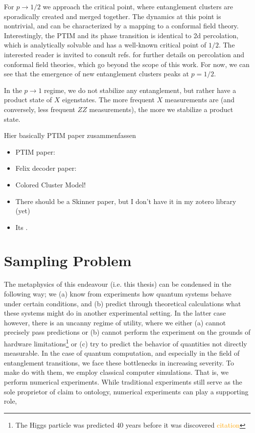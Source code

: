 For $p \to 1 /2$ we approach the critical point,
where entanglement clusters are sporadically created and merged together. The
dynamics at this point is nontrivial, and can be characterized by a mapping to
a conformal field theory. Interestingly, the PTIM and its phase transition is
identical to 2d percolation, which is analytically solvable and has a
well-known critical point of $1 /2$. The interested reader is invited to
consult refs.
\cite{aharonyIntroductionPercolationTheory2017,difrancescoConformalFieldTheory1997}
for further details on percolation and conformal field theories, which go
beyond the scope of this work. For now, we can see that the emergence of new
entanglement clusters peaks at $p = 1 /2$.

In the $p\to 1$ regime, we do not stabilize any entanglement, but rather
have a product state of $X$ eigenstates. The more frequent $X$ measurements are
(and conversely, less frequent $ZZ$ measurements), the more we stabilize a
product state.


Hier basically PTIM paper zusammenfassen
\begin{itemize}
  \item PTIM paper: 
    \cite{langEntanglementTransitionProjective2020}
  \item Felix decoder paper: 
    \cite{roserDecodingProjectiveTransverse2023}
  \item Colored Cluster Model!
  \item There should be a Skinner paper, but I don't have it in my zotero
    library (yet)
  \item Its \cite{nahumEntanglementDynamicsDiffusionannihilation2020}.
\end{itemize}

\section{Sampling Problem}\label{sec:sampling}
The metaphysics of this endeavour (i.e. this thesis) can
be condensed in the following way; we (a) know from experiments how quantum
systems behave under certain conditions, and (b) predict through theoretical
calculations what these systems might do in another experimental setting. In
the latter case however, there is an uncanny regime of utility, where we either
(a) cannot precisely pass predictions or (b) cannot perform the experiment on
the grounds of hardware limitations\footnote{The Higgs particle was predicted
40 years before it was discovered \textcolor{orange}{citation}} or (c) try to
predict the behavior of quantities not directly measurable. In the case of
quantum computation, and especially in the field of entanglement transitions,
we face these bottlenecks in increasing severity. To make do with them, we
employ classical computer simulations. That is, we perform numerical
experiments. While traditional experiments still serve as the sole proprietor of claim to
ontology, numerical experiments can play a supporting role, 

